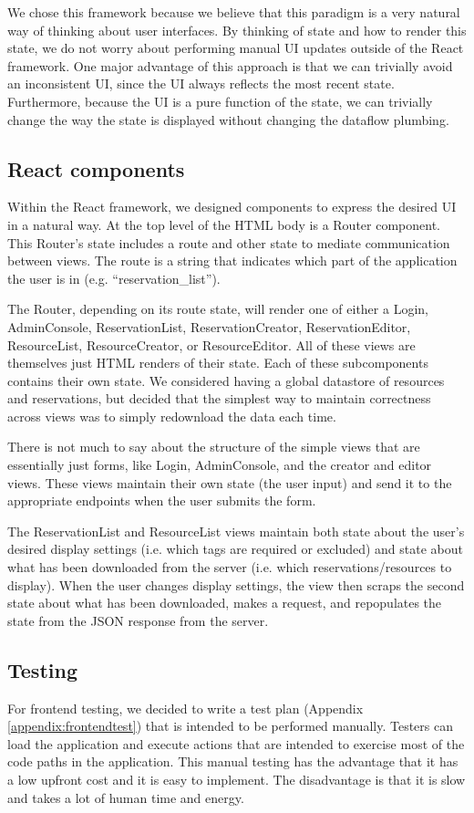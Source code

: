 \documentclass[12pt]{article}
\begin{document}
We chose this framework because we believe that this paradigm is a very natural way of thinking about user interfaces. By thinking of state and how to render this state, we do not worry about performing manual UI updates outside of the React framework. One major advantage of this approach is that we can trivially avoid an inconsistent UI, since the UI always reflects the most recent state. Furthermore, because the UI is a pure function of the state, we can trivially change the way the state is displayed without changing the dataflow plumbing.

\subsection{React components}
Within the React framework, we designed components to express the desired UI in a natural way. At the top level of the HTML body is a Router component. This Router's state includes a route and other state to mediate communication between views. The route is a string that indicates which part of the application the user is in (e.g. ``reservation\_list'').

The Router, depending on its route state, will render one of either a Login, AdminConsole, ReservationList, ReservationCreator, ReservationEditor, ResourceList, ResourceCreator, or ResourceEditor. All of these views are themselves just HTML renders of their state. Each of these subcomponents contains their own state. We considered having a global datastore of resources and reservations, but decided that the simplest way to maintain correctness across views was to simply redownload the data each time.

There is not much to say about the structure of the simple views that are essentially just forms, like Login, AdminConsole, and the creator and editor views. These views maintain their own state (the user input) and send it to the appropriate endpoints when the user submits the form.

The ReservationList and ResourceList views maintain both state about the user's desired display settings (i.e. which tags are required or excluded) and state about what has been downloaded from the server (i.e. which reservations/resources to display). When the user changes display settings, the view then scraps the second state about what has been downloaded, makes a request, and repopulates the state from the JSON response from the server.

\subsection{Testing}
For frontend testing, we decided to write a test plan (Appendix \ref{appendix:frontendtest}) that is intended to be performed manually. Testers can load the application and execute actions that are intended to exercise most of the code paths in the application. This manual testing has the advantage that it has a low upfront cost and it is easy to implement. The disadvantage is that it is slow and takes a lot of human time and energy.
\end{document}
